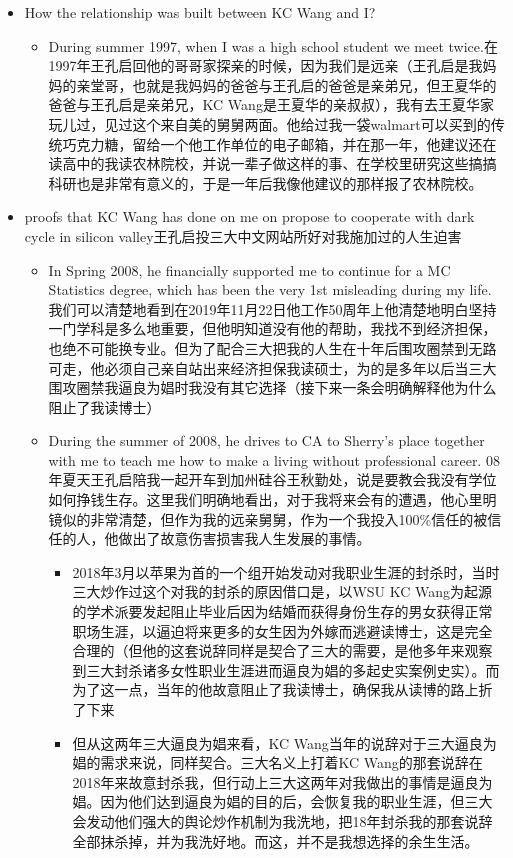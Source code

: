 \documentclass[9pt, b5paper]{article}
\begin{document}
\begin{itemize}
\item How the relationship was built between KC Wang and I?
\begin{itemize}
\item During summer 1997, when I was a high school student we meet twice.在1997年王孔启回他的哥哥家探亲的时候，因为我们是远亲（王孔启是我妈妈的亲堂哥，也就是我妈妈的爸爸与王孔启的爸爸是亲弟兄，但王夏华的爸爸与王孔启是亲弟兄，KC Wang是王夏华的亲叔叔），我有去王夏华家玩儿过，见过这个来自美的舅舅两面。他给过我一袋walmart可以买到的传统巧克力糖，留给一个他工作单位的电子邮箱，并在那一年，他建议还在读高中的我读农林院校，并说一辈子做这样的事、在学校里研究这些搞搞科研也是非常有意义的，于是一年后我像他建议的那样报了农林院校。
\end{itemize}
\item proofs that KC Wang has done on me on propose to cooperate with dark cycle in silicon valley王孔启投三大中文网站所好对我施加过的人生迫害
\begin{itemize}
\item In Spring 2008, he financially supported me to continue for a MC Statistics degree, which has been the very 1st misleading during my life. 我们可以清楚地看到在2019年11月22日他工作50周年上他清楚地明白坚持一门学科是多么地重要，但他明知道没有他的帮助，我找不到经济担保，也绝不可能换专业。但为了配合三大把我的人生在十年后围攻圈禁到无路可走，他必须自己亲自站出来经济担保我读硕士，为的是多年以后当三大围攻圈禁我逼良为娼时我没有其它选择（接下来一条会明确解释他为什么阻止了我读博士）
\item During the summer of 2008, he drives to CA to Sherry's place together with me to teach me how to make a living without professional career. 08年夏天王孔启陪我一起开车到加州硅谷王秋勤处，说是要教会我没有学位如何挣钱生存。这里我们明确地看出，对于我将来会有的遭遇，他心里明镜似的非常清楚，但作为我的远亲舅舅，作为一个我投入100\%信任的被信任的人，他做出了故意伤害损害我人生发展的事情。
\begin{itemize}
\item 2018年3月以苹果为首的一个组开始发动对我职业生涯的封杀时，当时三大炒作过这个对我的封杀的原因借口是，以WSU KC Wang为起源的学术派要发起阻止毕业后因为结婚而获得身份生存的男女获得正常职场生涯，以逼迫将来更多的女生因为外嫁而逃避读博士，这是完全合理的（但他的这套说辞同样是契合了三大的需要，是他多年来观察到三大封杀诸多女性职业生涯进而逼良为娼的多起史实案例史实）。而为了这一点，当年的他故意阻止了我读博士，确保我从读博的路上折了下来
\item 但从这两年三大逼良为娼来看，KC Wang当年的说辞对于三大逼良为娼的需求来说，同样契合。三大名义上打着KC Wang的那套说辞在2018年来故意封杀我，但行动上三大这两年对我做出的事情是逼良为娼。因为他们达到逼良为娼的目的后，会恢复我的职业生涯，但三大会发动他们强大的舆论炒作机制为我洗地，把18年封杀我的那套说辞全部抹杀掉，并为我洗好地。而这，并不是我想选择的余生生活。

\end{itemize}
\end{itemize}
\end{itemize}
\end{document}
